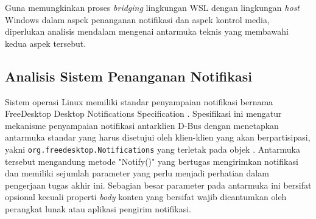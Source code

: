 Guna memungkinkan proses \textit{bridging} lingkungan WSL dengan lingkungan \textit{host} Windows dalam aspek penanganan notifikasi dan aspek kontrol media, diperlukan analisis mendalam mengenai antarmuka teknis yang membawahi kedua aspek tersebut.

\subsection{Analisis Sistem Penanganan Notifikasi}

Sistem operasi Linux memiliki standar penyampaian notifikasi bernama FreeDesktop Desktop Notifications Specification \cite{xdg-desktop-notifications-specification}. Spesifikasi ini mengatur mekanisme penyampaian notifikasi antarklien D-Bus dengan menetapkan antarmuka standar yang harus disetujui oleh klien-klien yang akan berpartisipasi, yakni \verb|org.freedesktop.Notifications| yang terletak pada objek . Antarmuka tersebut mengandung metode "Notify()" yang bertugas mengirimkan notifikasi dan memiliki sejumlah parameter yang perlu menjadi perhatian dalam pengerjaan tugas akhir ini. Sebagian besar parameter pada antarmuka ini bersifat opsional kecuali properti \textit{body} konten yang bersifat wajib dicantumkan oleh perangkat lunak atau aplikasi pengirim notifikasi.
